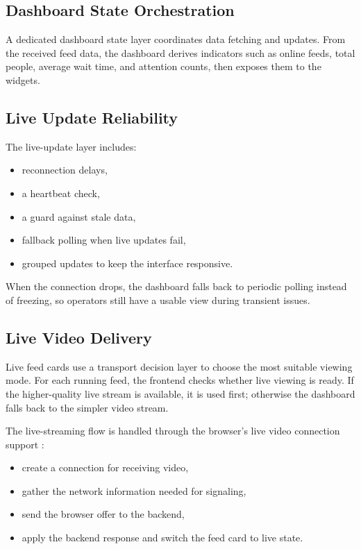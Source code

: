 \subsection{Dashboard State Orchestration}
A dedicated dashboard state layer coordinates data fetching and updates. From the received feed data, the dashboard derives indicators such as online feeds, total people, average wait time, and attention counts, then exposes them to the widgets.

\subsection{Live Update Reliability}
The live-update layer includes:
\begin{itemize}
    \item reconnection delays,
    \item a heartbeat check,
    \item a guard against stale data,
    \item fallback polling when live updates fail,
    \item grouped updates to keep the interface responsive.
\end{itemize}
When the connection drops, the dashboard falls back to periodic polling instead of freezing, so operators still have a usable view during transient issues.

\subsection{Live Video Delivery}
Live feed cards use a transport decision layer to choose the most suitable viewing mode. For each running feed, the frontend checks whether live viewing is ready. If the higher-quality live stream is available, it is used first; otherwise the dashboard falls back to the simpler video stream.

The live-streaming flow is handled through the browser's live video connection support \cite{webrtc_w3c}:
\begin{itemize}
    \item create a connection for receiving video,
    \item gather the network information needed for signaling,
    \item send the browser offer to the backend,
    \item apply the backend response and switch the feed card to live state.
\end{itemize}

